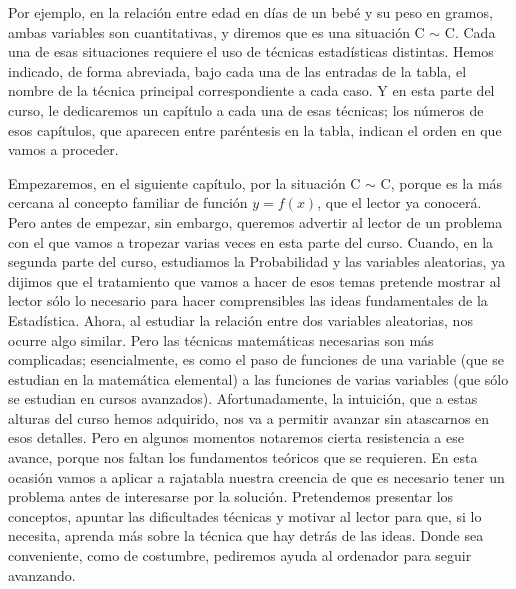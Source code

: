 Por ejemplo, en la relación entre edad en días de un bebé y su peso en gramos, ambas variables son
cuantitativas, y diremos que es una situación C $\sim$ C. Cada una de esas situaciones requiere el
uso de técnicas estadísticas distintas. Hemos indicado, de forma abreviada, bajo cada una de las
entradas de la tabla, el nombre de la técnica principal correspondiente a cada caso. Y en esta parte del curso, le dedicaremos un capítulo a cada una de esas técnicas; los números de esos capítulos, que aparecen
entre paréntesis en la tabla, indican el orden en que vamos a proceder.

Empezaremos, en el siguiente capítulo, por la situación C $\sim$ C, porque es la más cercana al
concepto familiar de función $y=f(x)$, que el lector ya conocerá. Pero antes de empezar, sin embargo,
queremos advertir al lector de un problema con el que vamos a tropezar varias veces en esta parte
del curso. Cuando, en la segunda parte del curso, estudiamos la Probabilidad y las variables
aleatorias, ya dijimos que el tratamiento que vamos a hacer de esos temas pretende mostrar al
lector sólo lo necesario para hacer comprensibles las ideas fundamentales de la Estadística. Ahora,
al estudiar la relación entre dos variables aleatorias, nos ocurre algo  similar. Pero las técnicas
matemáticas necesarias son más complicadas; esencialmente, es como el paso de funciones de una
variable (que se estudian en la matemática elemental) a las funciones de varias variables (que sólo
se estudian en cursos avanzados). Afortunadamente, la intuición, que a estas alturas del curso
hemos adquirido, nos va a permitir avanzar sin atascarnos en esos detalles. Pero en algunos
momentos notaremos cierta resistencia a ese avance, porque nos faltan los fundamentos teóricos que
se requieren. En esta ocasión vamos a aplicar a rajatabla nuestra creencia de que es necesario
tener un problema antes de interesarse por la solución. Pretendemos presentar los conceptos,
apuntar las dificultades técnicas y motivar al lector para que, si lo necesita, aprenda más sobre
la técnica que hay detrás de las ideas. Donde sea conveniente, como de costumbre, pediremos ayuda
al ordenador para seguir avanzando.
